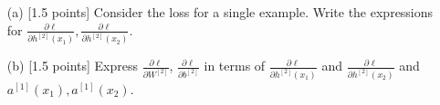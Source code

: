 \documentclass{article}
\newif\ifsolutions
\newenvironment{labelledanswer}{{\bf Answer:} \sf }{}%
\newcommand{\answer}[2]
{{
\ifsolutions
\begin{labelledanswer}
\color{red} 
#2
\end{labelledanswer}
\else
#1
\fi
}}
\begin{document}
\begin{itemize}
    \item [(a)] [1.5 points] Consider the loss for a single example. Write the expressions for $\frac{\partial \ell}{\partial h^{[2]}(x_1)},  \frac{\partial \ell}{\partial h^{[2]}(x_2)}$. 
    
    \answer{}{

$$
\frac{\partial}{\partial h^{[2]}(x_1)} \ell(x_1, x_2, y; W, b)= \frac{1}{1 + \exp(-y{h^{[2]}(x_1)}^\top h^{[2]}(x_2))} \;  \left(  0 + \exp(-y{h^{[2]}(x_1)}^\top h^{[2]}(x_2)) (-y h^{[2]}(x_2))   \right)
$$
$$
= \frac{ -y h^{[2]}(x_2) e^{(-y{h^{[2]}(x_1)}^\top h^{[2]}(x_2))}}{1 + e^{ -y{h^{[2]}(x_1)}^\top h^{[2]}(x_2)}}
$$

$$
\frac{\partial}{\partial h^{[2]}(x_2)} \ell(x_1, x_2, y; W, b)= \frac{1}{1 + \exp(-y{h^{[2]}(x_1)}^\top h^{[2]}(x_2))} \;  \left(  0 + \exp(-y{h^{[2]}(x_1)}^\top h^{[2]}(x_2)) (-y {h^{[2]}(x_1))}^\top   \right)
$$
$$
= \frac{ -y {h^{[2]}(x_1)}^\top e^{(-y{h^{[2]}(x_1)}^\top h^{[2]}(x_2))}}{1 + e^{-y{h^{[2]}(x_1)}^\top h^{[2]}(x_2)}} 
$$           
    }
    
    \item [(b)] [1.5 points] Express $\frac{\partial \ell}{\partial W^{[2]}}$, $\frac{\partial \ell}{\partial b^{[2]}}$ in terms of $\frac{\partial \ell}{\partial h^{[2]}(x_1)}$ and $\frac{\partial \ell}{\partial h^{[2]}(x_2)}$ and $a^{[1]}(x_1), a^{[1]}(x_2)$.
    
    \answer{}{

}
\end{itemize}
\end{document}
